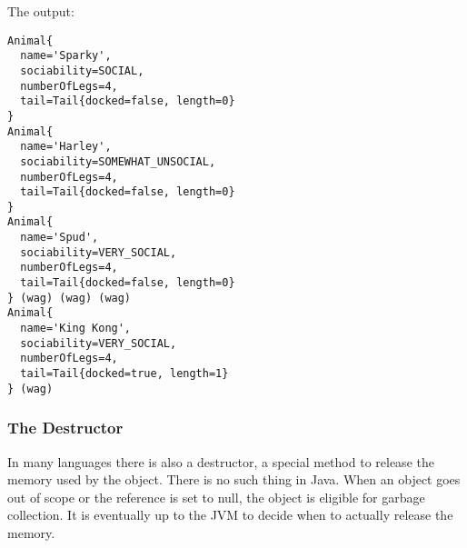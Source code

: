 The output:
\begin{lstlisting}
Animal{
  name='Sparky', 
  sociability=SOCIAL, 
  numberOfLegs=4, 
  tail=Tail{docked=false, length=0}
}
Animal{
  name='Harley', 
  sociability=SOMEWHAT_UNSOCIAL, 
  numberOfLegs=4, 
  tail=Tail{docked=false, length=0}
}
Animal{
  name='Spud', 
  sociability=VERY_SOCIAL, 
  numberOfLegs=4, 
  tail=Tail{docked=false, length=0}
} (wag) (wag) (wag)
Animal{
  name='King Kong', 
  sociability=VERY_SOCIAL, 
  numberOfLegs=4, 
  tail=Tail{docked=true, length=1}
} (wag)
\end{lstlisting}

\subsubsection{The Destructor}
In many languages there is also a destructor, a special method to release the memory used by the object. There is no such thing in Java. When an object goes out of scope or the reference is set to null, the object is eligible for garbage collection. It is eventually up to the JVM to decide when to actually release the memory.
